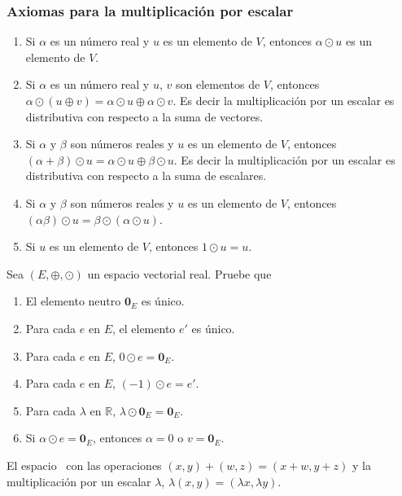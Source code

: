 \subsubsection*{Axiomas para la multiplicación por escalar}
\begin{enumerate}
\item Si $\alpha$ es un número real y $u$ es un elemento de $V$, entonces $\alpha \odot u$ es un elemento de $V$.
\item Si $\alpha$ es un número real y $u$, $v$ son elementos de $V$, entonces $\alpha\odot (u\oplus v) = \alpha\odot u \oplus \alpha \odot v$. Es decir la multiplicación por un escalar es distributiva con respecto a la suma de vectores.
\item Si $\alpha$ y $\beta$ son números reales y $u$ es un elemento de $V$, entonces $(\alpha + \beta)\odot u = \alpha \odot u \oplus \beta \odot u$. Es decir la multiplicación por un escalar es distributiva con respecto a la suma de escalares.
\item Si $\alpha$ y $\beta$ son números reales y $u$ es un elemento de $V$, entonces $(\alpha \beta) \odot u = \beta\odot(\alpha \odot u)$.
\item Si $u$ es un elemento de $V$, entonces $1 \odot u = u$.

\end{enumerate}

\begin{trabajoautonomo}
Sea $(E, \oplus, \odot)$ un espacio vectorial real. Pruebe que
\begin{enumerate}
\item El elemento neutro $\mathbf{0}_E$ es único.
\item Para cada $e$ en $E$, el elemento $e'$ es único.
\item Para cada $e$ en $E$, $0 \odot e = \mathbf{0}_E$.
\item Para cada $e$ en $E$, $(-1) \odot e = e'$.
\item Para cada $\lambda$ en $\mathbb{R}$, $\lambda \odot \mathbf{0}_E = \mathbf{0}_E$.
\item Si $\alpha \odot e = \mathbf{0}_E$, entonces $\alpha = 0$ o $v=\mathbf{0}_E$.

\end{enumerate}
\end{trabajoautonomo}
\begin{ejemplo}

El espacio \rdos \ con las operaciones $(x,y)+(w,z) = (x+w,y+z)$ y la multiplicación por un escalar $\lambda$, $\lambda (x,y) = (\lambda x,\lambda y)$.

\end{ejemplo}

